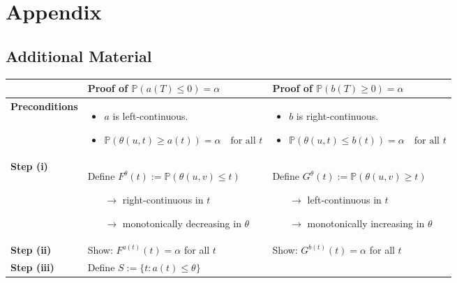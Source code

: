 \chapter*{Appendix}


\section*{Additional Material}


\begin{table}[H]
	\renewcommand{\arraystretch}{1.5}
	\begin{center}
		\begin{tabularx}{\textwidth}{|p{2.1cm}|Y|Y|}
			\hline
			& \textbf{Proof of $\mathbb{P}(a(T)\leq 0)=\alpha$}
			& \textbf{Proof of $\mathbb{P}(b(T)\geq 0)=\alpha$}
			\\
			\hline
			\textbf{Preconditions}
			&
			\begin{itemize}[leftmargin=*,nosep]
				\item $a$ is left-continuous.
				\item $\mathbb{P}(\theta(u,t)\geq a(t))=\alpha
				\quad \text{for all } t$
			\end{itemize}
			&
			\begin{itemize}[leftmargin=*,nosep]
				\item $b$ is right-continuous.
				\item $\mathbb{P}(\theta(u,t)\leq b(t))=\alpha
				\quad \text{for all } t$
			\end{itemize}
			\\
			\hline
			\textbf{Step (i)}
			&
			Define
			\(
			F^\theta(t):=
			\mathbb{P}(\theta(u,v)\leq t)
			\)
			\begin{itemize}[nosep]
				\item[$\rightarrow$] right-continuous in $t$
				\item[$\rightarrow$] monotonically decreasing in $\theta$
			\end{itemize}
			&
			Define
			\(
			G^\theta(t):=
			\mathbb{P}(\theta(u,v)\geq t)
			\)
			\begin{itemize}[nosep]
				\item[$\rightarrow$] left-continuous in $t$
				\item[$\rightarrow$] monotonically increasing in $\theta$
			\end{itemize}
			\\
			\hline
			\textbf{Step (ii)}
			&
			Show:
			\(
			F^{a(t)}(t)=\alpha
			\)
			for all $t$
			&
			Show:
			\(
			G^{b(t)}(t)=\alpha
			\)
			for all $t$
			\\
			\hline
			\textbf{Step (iii)}
			&
			Define
			$S:=\{t:a(t)\leq \theta\}$
			

\end{tabularx}
\end{center}
\end{table}

